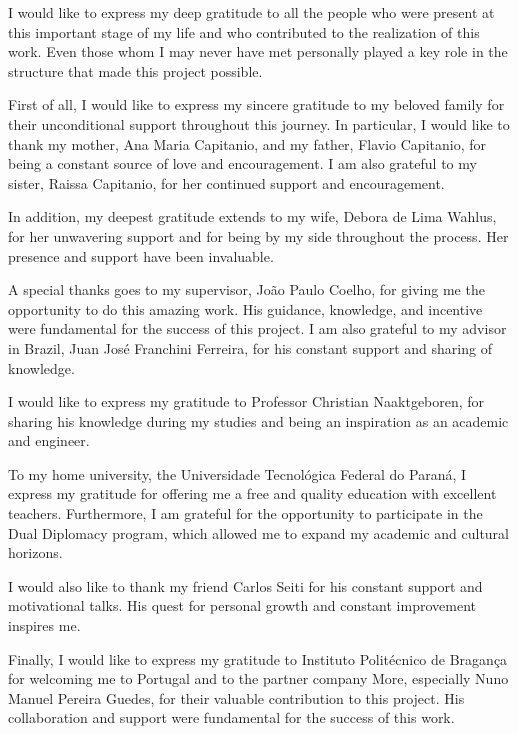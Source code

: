 

I would like to express my deep gratitude to all the people who were present at this important stage of my life and who contributed to the realization of this work. Even those whom I may never have met personally played a key role in the structure that made this project possible.

First of all, I would like to express my sincere gratitude to my beloved family for their unconditional support throughout this journey. In particular, I would like to thank my mother, Ana Maria Capitanio, and my father, Flavio Capitanio, for being a constant source of love and encouragement. I am also grateful to my sister, Raissa Capitanio, for her continued support and encouragement.

In addition, my deepest gratitude extends to my wife, Debora de Lima Wahlus, for her unwavering support and for being by my side throughout the process. Her presence and support have been invaluable.

A special thanks goes to my supervisor, João Paulo Coelho, for giving me the opportunity to do this amazing work. His guidance, knowledge, and incentive were fundamental for the success of this project. I am also grateful to my advisor in Brazil, Juan José Franchini Ferreira, for his constant support and sharing of knowledge.

I would like to express my gratitude to Professor Christian Naaktgeboren, for sharing his knowledge during my studies and being an inspiration as an academic and engineer.

To my home university, the Universidade Tecnológica Federal do Paraná, I express my gratitude for offering me a free and quality education with excellent teachers. Furthermore, I am grateful for the opportunity to participate in the Dual Diplomacy program, which allowed me to expand my academic and cultural horizons.

I would also like to thank my friend Carlos Seiti for his constant support and motivational talks. His quest for personal growth and constant improvement inspires me.

Finally, I would like to express my gratitude to Instituto Politécnico de Bragança for welcoming me to Portugal and to the partner company More, especially Nuno Manuel Pereira Guedes, for their valuable contribution to this project. His collaboration and support were fundamental for the success of this work.

